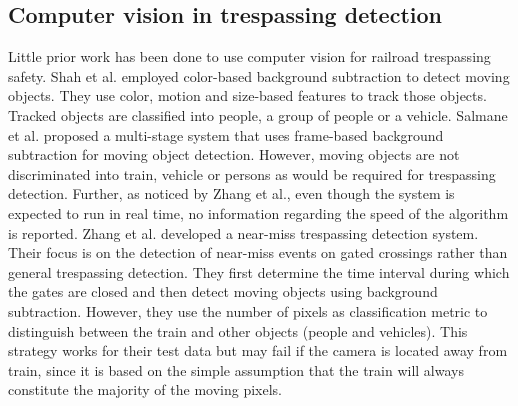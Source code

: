 \begin{comment}
Different engineering strategies used to prevent collision can be broadly classified as sealed corridors, obstacle detection and traffic channelization\cite{chadwick2014highway}. The concept of sealed corridors presents an ideal solution to the problem, however, high costs and reduced access renders it less attractive. Obstacle detection refers to detecting the presence of person or vehicle on tracks and communicating it to the approaching train\cite{glover09}. It provides a cost-effective and feasible way to reduce collision risk, however the main challenge is the short reaction time available to bring the train to stop. Glover\cite{glover09} suggests that there may be limited reduction in severity of a collision because train may still collide. However, Hall\cite{hall2007reducing} argues that obstacle detection may still be beneficial as it might give invaluable time to decelerate the train sufficiently to save human life. Traffic channelization is another effective strategy which separates the traffic flow from rail tracks. Federal Railroad Administration research shows positive results and suggests that it discourages risky driving behaviour around the crossing\cite{horton2012use}. 
\end{comment}



\subsection{Computer vision in trespassing detection} 
Little prior work has been done to use computer vision for railroad trespassing safety. Shah et al.\cite{shah2007automated} employed color-based background subtraction to detect moving objects. They use color, motion and size-based features to track those objects. Tracked objects are classified into people, a group of people or a vehicle. Salmane et al.\cite{salmane2015video} proposed a multi-stage system that uses frame-based background subtraction for moving object detection. However, moving objects are not discriminated into train, vehicle or persons as would be required for trespassing detection. Further, as noticed by Zhang et al.\cite{zhang2018automated}, even though the system is expected to run in real time, no information regarding the speed of the algorithm is reported. Zhang et al.\cite{zhang2018automated} developed a near-miss trespassing detection system. Their focus is on the detection of near-miss events on gated crossings rather than general trespassing detection. They first determine the time interval during which the gates are closed and then detect moving objects using background subtraction. However, they use the number of pixels as classification metric to distinguish between the train and other objects (people and vehicles). This strategy works for their test data but may fail if the camera is located away from train, since it is based on the simple assumption that the train will always constitute the majority of the moving pixels. 

